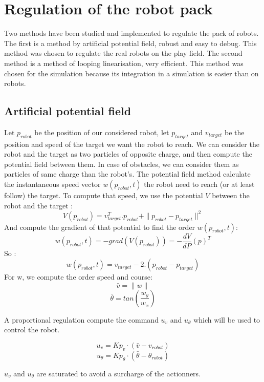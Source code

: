 \section{Regulation of the robot pack}

Two methods have been studied and implemented to regulate the pack of robots. The first is a method by artificial potential field, robust and easy to debug. This method was chosen to regulate the real robots on the play field. The second method is a method of looping linearisation, very efficient. This method was chosen for the simulation because its integration in a simulation is easier than on robots.

\subsection{Artificial potential field}
Let $p_{robot}$ be the position of our considered robot, let $p_{target}$ and $v_{target}$ be the position and speed of the target we want the robot to reach.
We can consider the robot and the target as two particles of opposite charge, and then compute the potential field between them. In case of obstacles, we can consider them as particles of same charge than the robot's.
The potential field method calculate the instantaneous speed vector $w(p_{robot},t)$ the robot need to reach (or at least follow) the target. To compute that speed, we use the potential $V$ between the robot and the target :\\
\[ V(p_{robot}) = v^T_{target}. p_{robot} + \|p_{robot}-p_{target}\|^2 \]
And compute the gradient of that potential to find the order $w(p_{robot},t)$:
\[w(p_{robot},t) = -grad(V(p_{robot})) = -\frac{dV}{dP}(p)^T\]
So :
\[w(p_{robot},t) = v_{target}-2.(p_{robot}-p_{target})\]
For w, we compute the order speed and course:
\[\bar{v} = \|w\| \]
\[\bar{\theta} = tan(\frac{w_y}{w_x})\]

A proportional regulation compute the command $u_v$ and $u_{\theta}$ which will be used to control the robot.

\[ u_v = Kp_v \cdot (\bar{v}-v_{robot}) \]
\[ u_{\theta} = Kp_{\theta} \cdot (\bar{\theta}-\theta_{robot}) \]

$u_v$ and $u_{\theta}$ are saturated to avoid a surcharge of the actionners. 
